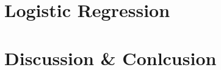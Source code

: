 \documentclass[10pt,a4paper]{article}
\begin{document}
\section{Logistic Regression}
\section{Discussion \& Conlcusion}
\end{document}
